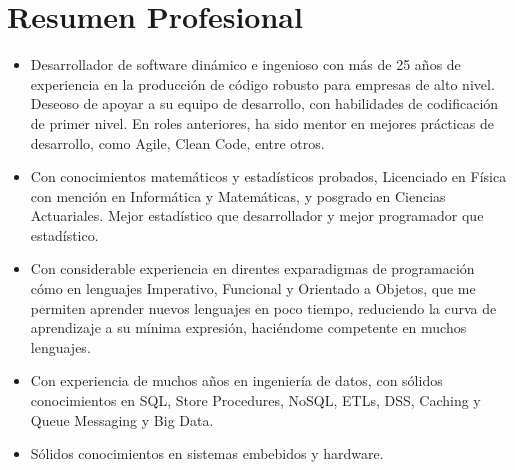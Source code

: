 \section{Resumen Profesional}

\begin{itemize}
    \item Desarrollador de software dinámico e ingenioso con más de 25 años de experiencia en la producción
          de código robusto para empresas de alto nivel. Deseoso de apoyar a su equipo de desarrollo, con
          habilidades de codificación de primer nivel. En roles anteriores, ha sido mentor en mejores prácticas
          de desarrollo, como Agile, Clean Code, entre otros.
    \item Con conocimientos matemáticos y estadísticos probados, Licenciado en Física con mención en Informática
          y Matemáticas, y posgrado en Ciencias Actuariales. Mejor estadístico que desarrollador y mejor
          programador que estadístico.
    \item Con considerable experiencia en direntes exparadigmas de programación cómo en lenguajes Imperativo,
          Funcional y Orientado a Objetos, que me permiten aprender nuevos lenguajes en poco tiempo, reduciendo
          la curva de aprendizaje a su mínima expresión, haciéndome competente en muchos lenguajes.
    \item Con experiencia de muchos años en ingeniería de datos, con sólidos conocimientos en SQL, Store
          Procedures, NoSQL, ETLs, DSS, Caching y Queue Messaging y Big Data.
    \item Sólidos conocimientos en sistemas embebidos y hardware.
\end{itemize}
